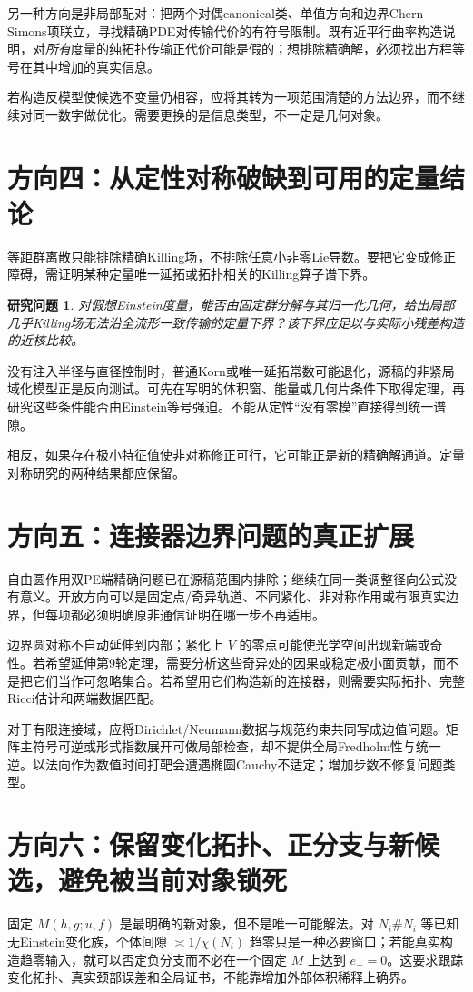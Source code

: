 \documentclass[UTF8,fontset=fandol,zihao=-4]{ctexart}
\theoremstyle{research}
\newtheorem{target}[sourceprop]{研究问题}
\begin{document}
另一种方向是非局部配对：把两个对偶canonical类、单值方向和边界Chern--Simons项联立，寻找精确PDE对传输代价的有符号限制。既有近平行曲率构造说明，对\emph{所有}度量的纯拓扑传输正代价可能是假的；想排除精确解，必须找出方程等号在其中增加的真实信息。

若构造反模型使候选不变量仍相容，应将其转为一项范围清楚的方法边界，而不继续对同一数字做优化。需要更换的是信息类型，不一定是几何对象。

\section{方向四：从定性对称破缺到可用的定量结论}
等距群离散只能排除精确Killing场，不排除任意小非零Lie导数。要把它变成修正障碍，需证明某种定量唯一延拓或拓扑相关的Killing算子谱下界。

\begin{target}
对假想Einstein度量，能否由固定群分解与其归一化几何，给出局部几乎Killing场无法沿全流形一致传输的定量下界？该下界应足以与实际小残差构造的近核比较。
\end{target}
没有注入半径与直径控制时，普通Korn或唯一延拓常数可能退化，源稿的非紧局域化模型正是反向测试。可先在写明的体积窗、能量或几何片条件下取得定理，再研究这些条件能否由Einstein等号强迫。不能从定性“没有零模”直接得到统一谱隙。

相反，如果存在极小特征值使非对称修正可行，它可能正是新的精确解通道。定量对称研究的两种结果都应保留。

\section{方向五：连接器边界问题的真正扩展}
自由圆作用双PE端精确问题已在源稿范围内排除；继续在同一类调整径向公式没有意义。开放方向可以是固定点/奇异轨道、不同紧化、非对称作用或有限真实边界，但每项都必须明确原非通信证明在哪一步不再适用。

边界圆对称不自动延伸到内部；紧化上 $V$ 的零点可能使光学空间出现新端或奇性。若希望延伸第9轮定理，需要分析这些奇异处的因果或稳定极小面贡献，而不是把它们当作可忽略集合。若希望用它们构造新的连接器，则需要实际拓扑、完整Ricci估计和两端数据匹配。

对于有限连接域，应将Dirichlet/Neumann数据与规范约束共同写成边值问题。矩阵主符号可逆或形式指数展开可做局部检查，却不提供全局Fredholm性与统一逆。以法向作为数值时间打靶会遭遇椭圆Cauchy不适定；增加步数不修复问题类型。

\section{方向六：保留变化拓扑、正分支与新候选，避免被当前对象锁死}
固定 $M(h,g;u,f)$ 是最明确的新对象，但不是唯一可能解法。对 $N_i\#N_i$ 等已知无Einstein变化族，个体间隙 $\asymp1/\chi(N_i)$ 趋零只是一种必要窗口；若能真实构造趋零输入，就可以否定负分支而不必在一个固定 $M$ 上达到 $e_-=0$。这要求跟踪变化拓扑、真实颈部误差和全局证书，不能靠增加外部体积稀释上确界。
\end{document}
